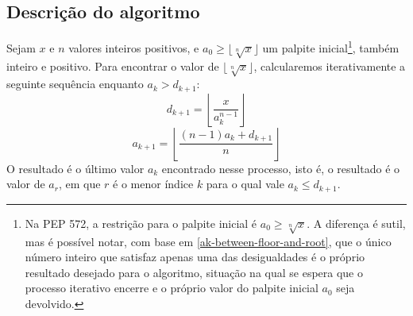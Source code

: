 \subsection*{Descrição do algoritmo}

Sejam $x$ e $n$ valores inteiros positivos,
e $a_0 \ge \lfloor \sqrt[n]{x} \rfloor$ um palpite inicial\footnote{
  Na PEP 572,
  a restrição para o palpite inicial é $a_0 \ge \sqrt[n]{x}$.
  A diferença é sutil, mas é possível notar,
  com base em \eqref{ak-between-floor-and-root},
  que o único número inteiro que satisfaz apenas uma das desigualdades
  é o próprio resultado desejado para o algoritmo,
  situação na qual se espera que o processo iterativo encerre
  e o próprio valor do palpite inicial $a_0$ seja devolvido.
},
também inteiro e positivo.
Para encontrar o valor de $\lfloor \sqrt[n]{x} \rfloor$,
calcularemos iterativamente a seguinte sequência
enquanto $a_k > d_{k+1}$:
\[
  d_{k+1} = \left\lfloor \dfrac{x}{a_k^{n-1}} \right\rfloor
\]
\[
  a_{k+1} = \left\lfloor \dfrac{(n-1) a_k + d_{k+1}}{n} \right\rfloor
\]
O resultado é o último valor $a_k$ encontrado nesse processo,
isto é, o resultado é o valor de $a_r$,
em que $r$ é o menor índice $k$ para o qual vale $a_k \le d_{k+1}$.
